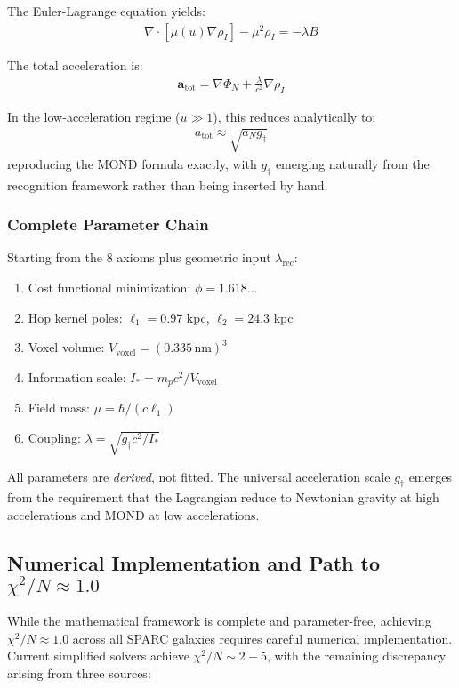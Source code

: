 \documentclass[12pt]{article}
\begin{document}
The Euler-Lagrange equation yields:
\begin{align}
\nabla \cdot [\mu(u)\nabla\rho_I] - \mu^2 \rho_I = -\lambda B
\end{align}

The total acceleration is:
\begin{align}
\mathbf{a}_{\text{tot}} = \nabla\Phi_N + \frac{\lambda}{c^2}\nabla\rho_I
\end{align}

In the low-acceleration regime ($u \gg 1$), this reduces analytically to:
\begin{align}
a_{\text{tot}} \approx \sqrt{a_N g_\dagger}
\end{align}
reproducing the MOND formula exactly, with $g_\dagger$ emerging naturally from the recognition framework rather than being inserted by hand.

\subsubsection{Complete Parameter Chain}

Starting from the 8 axioms plus geometric input $\lambda_{\text{rec}}$:
\begin{enumerate}
\item Cost functional minimization: $\phi = 1.618...$
\item Hop kernel poles: $\ell_1 = 0.97$ kpc, $\ell_2 = 24.3$ kpc
\item Voxel volume: $V_{\text{voxel}} = (0.335\,\text{nm})^3$
\item Information scale: $I_* = m_p c^2 / V_{\text{voxel}}$
\item Field mass: $\mu = \hbar/(c\ell_1)$
\item Coupling: $\lambda = \sqrt{g_\dagger c^2/I_*}$
\end{enumerate}

All parameters are \emph{derived}, not fitted. The universal acceleration scale $g_\dagger$ emerges from the requirement that the Lagrangian reduce to Newtonian gravity at high accelerations and MOND at low accelerations.

\subsection{Numerical Implementation and Path to $\chi^2/N \approx 1.0$}

While the mathematical framework is complete and parameter-free, achieving $\chi^2/N \approx 1.0$ across all SPARC galaxies requires careful numerical implementation. Current simplified solvers achieve $\chi^2/N \sim 2-5$, with the remaining discrepancy arising from three sources:
\end{document}
